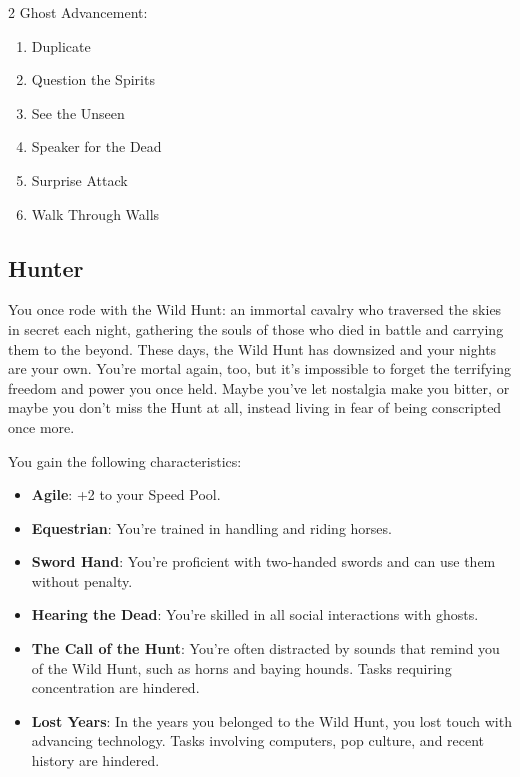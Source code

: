 \begin{multicols}{2}
Ghost Advancement:
\begin{enumerate}
\item Duplicate 
\item Question the Spirits 
\item See the Unseen 
\item Speaker for the Dead 
\item Surprise Attack 
\item Walk Through Walls 
\end{enumerate}

\subsection{Hunter}

You once rode with the Wild Hunt: an immortal cavalry who traversed the skies in secret each night, gathering the souls of those who died in battle and carrying them to the beyond. These days, the Wild Hunt has downsized and your nights are your own. You’re mortal again, too, but it’s impossible to forget the terrifying freedom and power you once held. Maybe you’ve let nostalgia make you bitter, or maybe you don’t miss the Hunt at all, instead living in fear of being conscripted once more.

You gain the following characteristics:

\begin{itemize}
\item \textbf{Agile}: +2 to your Speed Pool.
\item \textbf{Equestrian}: You’re trained in handling and riding horses.
\item \textbf{Sword Hand}: You’re proficient with two-handed swords and can use them without penalty.
\item \textbf{Hearing the Dead}: You’re skilled in all social interactions with ghosts.
\item \textbf{The Call of the Hunt}: You’re often distracted by sounds that remind you of the Wild Hunt, such as horns and baying hounds. Tasks requiring concentration are hindered.
\item \textbf{Lost Years}: In the years you belonged to the Wild Hunt, you lost touch with advancing technology. Tasks involving computers, pop culture, and recent history are hindered.
\end{itemize}


\end{multicols}
